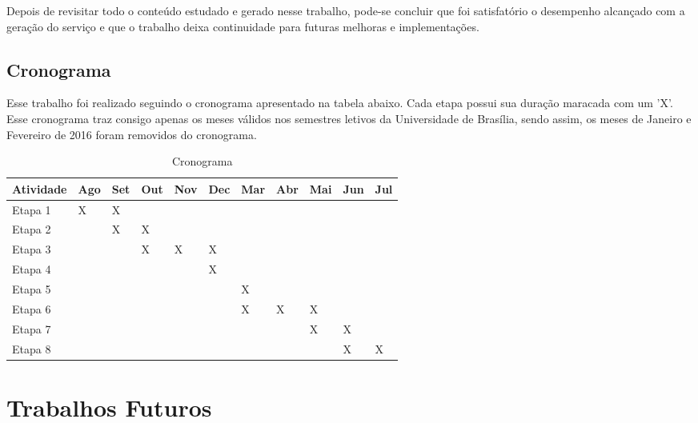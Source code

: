 Depois de revisitar todo o conteúdo estudado e gerado nesse trabalho, pode-se concluir que foi satisfatório o desempenho alcançado com a geração do serviço e que o trabalho deixa continuidade para futuras melhoras e implementações.

\subsection{Cronograma}

Esse trabalho foi realizado seguindo o cronograma apresentado na tabela abaixo. Cada etapa possui sua duração maracada com um 'X'. Esse cronograma traz consigo apenas os meses válidos nos semestres letivos da Universidade de Brasília, sendo assim, os meses de Janeiro e Fevereiro de 2016 foram removidos do cronograma.

\begin{table}[H]
\centering
\caption{Cronograma}
\label{my-label}
\begin{tabular}{|l|l|l|l|l|l|l|l|l|l|l|}
\hline
\rowcolor[HTML]{C0C0C0} 
Atividade                       & Ago & Set & Out & Nov & Dec & Mar & Abr & Mai & Jun & Jul \\ \hline
\cellcolor[HTML]{C0C0C0}Etapa 1 & X   & X   &     &     &     &     &     &     &     &     \\ \hline
\cellcolor[HTML]{C0C0C0}Etapa 2 &     & X   & X   &     &     &     &     &     &     &     \\ \hline
\cellcolor[HTML]{C0C0C0}Etapa 3 &     &     & X   & X   & X   &     &     &     &     &     \\ \hline
\cellcolor[HTML]{C0C0C0}Etapa 4 &     &     &     &     & X   &     &     &     &     &     \\ \hline
\cellcolor[HTML]{C0C0C0}Etapa 5 &     &     &     &     &     & X   &     &     &     &     \\ \hline
\cellcolor[HTML]{C0C0C0}Etapa 6 &     &     &     &     &     & X   & X   & X   &     &     \\ \hline
\cellcolor[HTML]{C0C0C0}Etapa 7 &     &     &     &     &     &     &     & X   & X   &     \\ \hline
\cellcolor[HTML]{C0C0C0}Etapa 8 &     &     &     &     &     &     &     &     & X   & X   \\ \hline
\end{tabular}
\end{table}


\section{Trabalhos Futuros}


